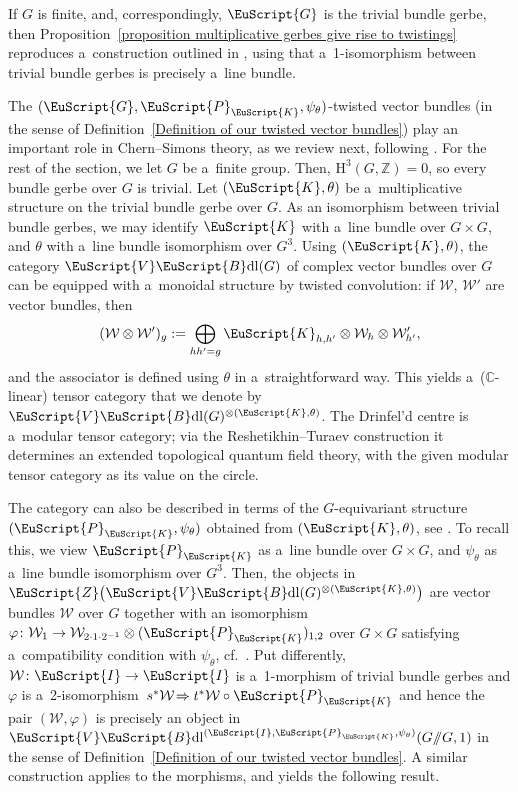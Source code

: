 \documentclass[pdftex]{sigma}
\numberwithin{equation}{section}
\def\mathscr#1{\EuScript{#1}}
\def\C {\mathbb{C}}
\def\h {\mathrm{H}}
\def\act#1#2{#1/\!\!/#2}
\newcommand{\VectBdl}{\mathscr{V}\mathscr{B}\mathrm{dl}}
\begin{document}
\begin{Remark}
 If $G$ is finite, and, correspondingly, $\mathscr{G}$ is the trivial bundle gerbe, then Proposition~\ref{proposition multiplicative gerbes give rise to twistings} reproduces a~construction outlined in \cite[equation (4.5)]{freed6}, using that a~1-isomorphism between trivial bundle gerbes
 is precisely a~line bundle.
\end{Remark}

The $(\mathscr{G},\mathscr{P}_{\mathscr{K}},\psi_{\theta})$-twisted vector bundles (in the sense of Definition~\ref{Definition of our twisted vector bundles})
play an important role in Chern--Simons theory, as we review next, following \cite[Section~4]{freed6}.
For the rest of the section, we let $G$ be a~finite group.
Then, $\h^3(G,\mathbb{Z})=0$, so every bundle gerbe over $G$ is trivial.
Let $(\mathscr{K},\theta)$ be a~multiplicative structure on the trivial bundle gerbe over $G$. As an isomorphism between trivial bundle gerbes, we may identify $\mathscr{K}$ with a~line bundle over $G \times G$, and $\theta$ with a~line bundle isomorphism over $G^3$.
Using $(\mathscr{K},\theta)$, the category $\VectBdl(G)$ of complex vector bundles over $G$ can be equipped with a~monoidal structure by twisted convolution: if $\mathcal{W}$, $\mathcal{W}'$ are vector bundles, then
\[
 (\mathcal{W} \otimes \mathcal{W}')_g := \bigoplus_{hh'=g} \mathscr{K}_{h,h'} \otimes \mathcal{W}_h \otimes \mathcal{W}'_{h'},
\]
and the associator is defined using $\theta$ in a~straightforward way.
This yields a~($\C$-linear) tensor category that we denote by $\VectBdl(G)^{\otimes (\mathscr{K},\theta)}$.
The Drinfel'd centre \smash{$\mathscr{Z}\bigl(\VectBdl(G)^{\otimes (\mathscr{K},\theta)}\bigr)$} is a~modular tensor category; via the Reshetikhin--Turaev construction it
 determines an extended topological quantum field theory, with the given modular tensor category as its value on the circle.

 The category
 \smash{$\mathscr{Z}\bigl(\VectBdl(G)^{\otimes (\mathscr{K},\theta)}\bigr)$} can also be described in terms of the $G$-equivariant structure $(\mathscr{P}_{\mathscr{K}},\psi_{\theta})$ obtained from $(\mathscr{K},\theta)$, see \cite[Proposition 4.9]{freed6}. To recall this, we view $\mathscr{P}_{\mathscr{K}}$ as a~line bundle over $G \times G$, and $\psi_{\theta}$ as a~line bundle isomorphism over $G^3$.
 Then, the objects in $\mathscr{Z}\bigl(\VectBdl(G)^{\otimes (\mathscr{K},\theta)}\bigr)$ are vector bundles $\mathcal{W}$ over $G$ together with an iso\-morphism
 $\varphi \colon \mathcal{W}_1 \to \mathcal{W}_{2\cdot 1\cdot 2^{-1}} \otimes (\mathscr{P}_{\mathscr{K}})_{1,2}$ over $G \times G$ satisfying a~compatibility condition with $\psi_{\theta}$, cf.\ \cite[equation~4.9]{freed6}.
 Put differently, $\mathcal{W} \colon \mathscr{I} \to \mathscr{I}$ is a~1-morphism of trivial bundle gerbes and $\varphi$
 is a~2-isomor\-phism~${s^*\mathcal{W} \!\Rightarrow t^*\mathcal{W} \circ \mathscr{P}_{\mathscr{K}}}$ and hence the pair $(\mathcal{W},\varphi)$ is precisely an object in
 $\VectBdl^{(\mathscr{I},\mathscr{P}_{\mathscr{K}},\psi_{\theta})}(\act GG,1)$ in the sense of Definition~\ref{Definition of our twisted vector bundles}. A similar construction applies to the morphisms, and yields the following result.
\end{document}
